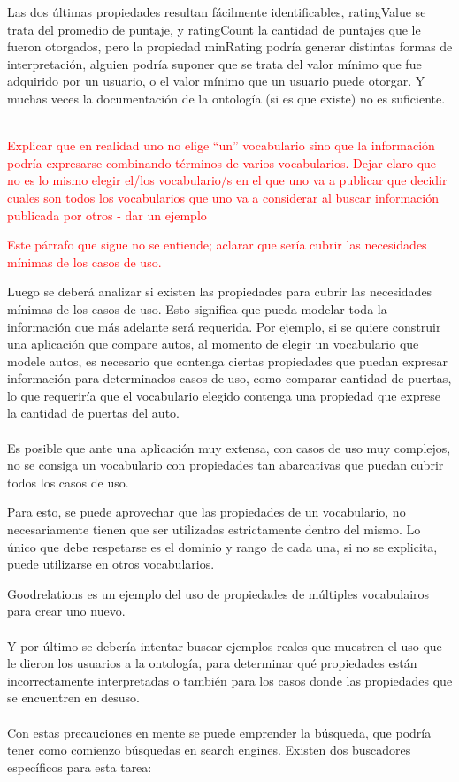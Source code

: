 \noindent Las dos últimas propiedades resultan fácilmente identificables, ratingValue se trata del promedio de puntaje, y ratingCount 
la cantidad de puntajes que le fueron otorgados, pero la propiedad minRating podría generar distintas formas de interpretación, 
alguien podría suponer que se trata del valor mínimo que fue adquirido por un usuario, o el valor mínimo que un usuario puede 
otorgar. Y muchas veces la documentación de la ontología (si es que existe) no es suficiente.
\\\\
\begin{framed}
\textcolor{red}{Explicar que en realidad uno no elige ``un'' vocabulario sino que la información podría expresarse combinando términos de varios vocabularios. Dejar claro que no es lo mismo elegir el/los vocabulario/s en el que uno va a publicar que decidir cuales son todos los vocabularios que uno va a considerar al buscar información publicada por otros - dar un ejemplo}
\end{framed}

\begin{framed}
\textcolor{red}{Este párrafo que sigue no se entiende; aclarar que sería cubrir las necesidades mínimas de los casos de uso.}
\end{framed}

\noindent Luego se deberá analizar si existen las propiedades para cubrir las necesidades mínimas de los casos de uso. Esto significa que pueda modelar 
toda la información que más adelante será requerida. Por ejemplo, si se quiere construir una aplicación que compare autos, al momento 
de elegir un vocabulario que modele autos, es necesario que contenga ciertas propiedades que puedan expresar información  para determinados 
casos de uso, como comparar cantidad de puertas, lo que requeriría que el vocabulario elegido contenga una propiedad que exprese la cantidad 
de puertas del auto.
\\\\
Es posible que ante una aplicación muy extensa, con casos de uso muy complejos, no se consiga un vocabulario con propiedades tan abarcativas 
que puedan cubrir todos los casos de uso. 

Para esto, se puede aprovechar que las propiedades de un vocabulario, no necesariamente tienen que ser utilizadas estrictamente dentro del mismo.
Lo único que debe respetarse es el dominio y rango de cada una, si no se explicita, puede utilizarse en otros vocabularios.

Goodrelations\cite{Hepp2008} es un ejemplo del uso de propiedades de múltiples vocabulairos para crear uno nuevo.
\\\\
Y por último se debería intentar buscar ejemplos reales que muestren el uso que le dieron los usuarios a la ontología, para 
determinar qué propiedades están incorrectamente interpretadas o también para los casos donde las propiedades que se encuentren 
en desuso.
\\\\
Con estas precauciones en mente se puede emprender la búsqueda, que podría tener como comienzo búsquedas en  search engines. 
Existen dos buscadores específicos para esta tarea:

